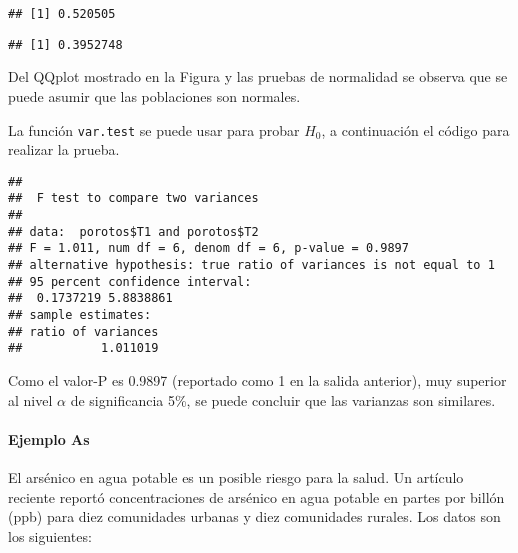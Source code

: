 \documentclass[
]{article}
\newenvironment{Shaded}{}{}
\newcommand{\AttributeTok}[1]{\textcolor[rgb]{0.49,0.56,0.16}{#1}}
\newcommand{\DecValTok}[1]{\textcolor[rgb]{0.25,0.63,0.44}{#1}}
\newcommand{\FloatTok}[1]{\textcolor[rgb]{0.25,0.63,0.44}{#1}}
\newcommand{\FunctionTok}[1]{\textcolor[rgb]{0.02,0.16,0.49}{#1}}
\newcommand{\NormalTok}[1]{#1}
\newcommand{\SpecialCharTok}[1]{\textcolor[rgb]{0.25,0.44,0.63}{#1}}
\newcommand{\StringTok}[1]{\textcolor[rgb]{0.25,0.44,0.63}{#1}}
\begin{document}
\begin{verbatim}
## [1] 0.520505
\end{verbatim}

\begin{Shaded}
\end{Shaded}

\begin{verbatim}
## [1] 0.3952748
\end{verbatim}

Del QQplot mostrado en la Figura y las pruebas de normalidad se observa
que se puede asumir que las poblaciones son normales.

La función \texttt{var.test} se puede usar para probar \(H_0\), a
continuación el código para realizar la prueba.

\begin{Shaded}
\end{Shaded}

\begin{verbatim}
## 
##  F test to compare two variances
## 
## data:  porotos$T1 and porotos$T2
## F = 1.011, num df = 6, denom df = 6, p-value = 0.9897
## alternative hypothesis: true ratio of variances is not equal to 1
## 95 percent confidence interval:
##  0.1737219 5.8838861
## sample estimates:
## ratio of variances 
##           1.011019
\end{verbatim}

Como el valor-P es 0.9897 (reportado como 1 en la salida anterior), muy
superior al nivel \(\alpha\) de significancia 5\%, se puede concluir que
las varianzas son similares.

\hypertarget{ejemplo-as}{%
\paragraph{Ejemplo As}\label{ejemplo-as}}

El arsénico en agua potable es un posible riesgo para la salud. Un
artículo reciente reportó concentraciones de arsénico en agua potable en
partes por billón (ppb) para diez comunidades urbanas y diez comunidades
rurales. Los datos son los siguientes:
\end{document}
